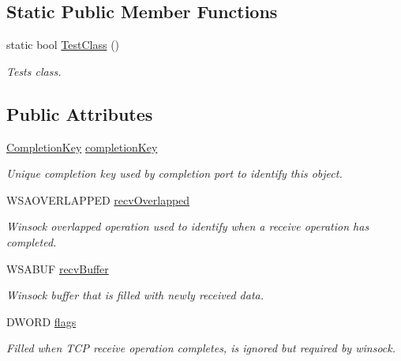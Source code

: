 \subsection*{Static Public Member Functions}
\begin{DoxyCompactItemize}
\item 
static bool \hyperlink{class_net_socket_ae2233dd5a751f07101b1347df5dfc308}{TestClass} ()
\begin{DoxyCompactList}\small\item\em Tests class. \item\end{DoxyCompactList}\end{DoxyCompactItemize}
\subsection*{Public Attributes}
\begin{DoxyCompactItemize}
\item 
\hyperlink{class_completion_key}{CompletionKey} \hyperlink{class_net_socket_a26693d766fabf449245ef0a1e2a5ff49}{completionKey}
\begin{DoxyCompactList}\small\item\em Unique completion key used by completion port to identify this object. \item\end{DoxyCompactList}\item 
WSAOVERLAPPED \hyperlink{class_net_socket_ac260f690a6f192c22463d1f5ea903d96}{recvOverlapped}
\begin{DoxyCompactList}\small\item\em Winsock overlapped operation used to identify when a receive operation has completed. \item\end{DoxyCompactList}\item 
WSABUF \hyperlink{class_net_socket_a0565a5dafc4df4589c0013d0c2816f33}{recvBuffer}
\begin{DoxyCompactList}\small\item\em Winsock buffer that is filled with newly received data. \item\end{DoxyCompactList}\item 
DWORD \hyperlink{class_net_socket_a794267d0dd5ed57e8d9bfdfea01d2995}{flags}
\begin{DoxyCompactList}\small\item\em Filled when TCP receive operation completes, is ignored but required by winsock. \item\end{DoxyCompactList}\end{DoxyCompactItemize}
